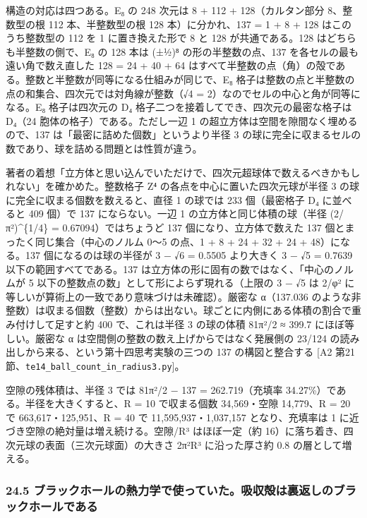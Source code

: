 \documentclass[
  a4paper,
]{ltjsarticle}
\begin{document}
構造の対応は四つある。E₈ の 248 次元は 8 + 112 + 128（カルタン部分
8、整数型の根 112 本、半整数型の根 128 本）に分かれ、137 = 1 + 8 + 128
はこのうち整数型の 112 を 1 に置き換えた形で 8 と 128 が共通である。128
はどちらも半整数の側で、E₈ の 128 本は (±½)⁸ の形の半整数の点、137
を各セルの最も遠い角で数え直した 128 = 24 + 40 + 64
はすべて半整数の点（角）の殻である。整数と半整数が同等になる仕組みが同じで、E₈
格子は整数の点と半整数の点の和集合、四次元では対角線が整数（√4 =
2）なのでセルの中心と角が同等になる。E₈ 格子は四次元の D₄
格子二つを接着してでき、四次元の最密な格子は D₄（24
胞体の格子）である。ただし一辺 1
の超立方体は空間を隙間なく埋めるので、137
は「最密に詰めた個数」というより半径 3
の球に完全に収まるセルの数であり、球を詰める問題とは性質が違う。

著者の着想「立方体と思い込んでいただけで、四次元超球体で数えるべきかもしれない」を確かめた。整数格子
Z⁴ の各点を中心に置いた四次元球が半径 3
の球に完全に収まる個数を数えると、直径 1 の球では 233 個（最密格子 D₄
に並べると 409 個）で 137 にならない。一辺 1
の立方体と同じ体積の球（半径 (2/π²)\^{}\{1/4\} = 0.67094）ではちょうど
137 個になり、立方体で数えた 137 個とまったく同じ集合（中心のノルム 0〜5
の点、1 + 8 + 24 + 32 + 24 + 48）になる。137 個になるのは球の半径が 3 −
√6 = 0.5505 より大きく 3 − √5 = 0.7639 以下の範囲すべてである。137
は立方体の形に固有の数ではなく、「中心のノルムが 5
以下の整数点の数」として形によらず現れる（上限の 3 − √5 は 2/φ²
に等しいが算術上の一致であり意味づけは未確認）。厳密な α（137.036
のような非整数）は収まる個数（整数）からは出ない。球ごとに内側にある体積の割合で重み付けして足すと約
400 で、これは半径 3 の球の体積 81π²/2 ≈ 399.7 にほぼ等しい。厳密な α
は空間側の整数の数え上げからではなく発展側の 23/124
の読み出しから来る、という第十四思考実験の三つの 137 の構図と整合する
{[}A2 第21節、\texttt{te14\_\allowbreak{}ball\_\allowbreak{}count\_\allowbreak{}in\_\allowbreak{}radius3.py}{]}。

空隙の残体積は、半径 3 では 81π²/2 − 137 = 262.719（充填率
34.27\%）である。半径を大きくすると、R = 10 で収まる個数 34,569・空隙
14,779、R = 20 で 663,617・125,951、R = 40 で 11,595,937・1,037,157
となり、充填率は 1 に近づき空隙の絶対量は増え続ける。空隙/R³
はほぼ一定（約 16）に落ち着き、四次元球の表面（三次元球面）の大きさ
2π²R³ に沿った厚さ約 0.8 の層として増える。

\subsubsection{24.5
ブラックホールの熱力学で使っていた。吸収殻は裏返しのブラックホールである}\label{ux30d6ux30e9ux30c3ux30afux30dbux30fcux30ebux306eux71b1ux529bux5b66ux3067ux4f7fux3063ux3066ux3044ux305fux5438ux53ceux6bbbux306fux88cfux8fd4ux3057ux306eux30d6ux30e9ux30c3ux30afux30dbux30fcux30ebux3067ux3042ux308b}
\end{document}
